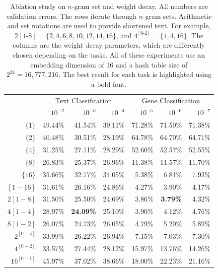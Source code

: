 \documentclass[sigconf,review, anonymous]{acmart}
\begin{document}
\begin{table}[t]
  \caption{Ablation study on \(n\)-gram set and weight decay. All numbers are validation errors. The rows iterate through \(n\)-gram sets. Arithmetic and set notations are used to provide shortened text. For example, \(2[1\text{-}8] = \{2,4,6,8,10,12,14,16\}\), and \(4^{[0\text{-}2]}=\{1,4,16\}\). The columns are the weight decay parameters, which are differently chosen depending on the tasks. All of these experiments use an embedding dimension of 16 and a hash table size of \(2^{24}=16,777,216\). The best result for each task is highlighted using a bold font.}
  \label{tab:gram}
  \begin{center}
    \begin{tabular}{r|rrr|rrr}
      \hline
      & \multicolumn{3}{|c}{Text Classification}  & \multicolumn{3}{|c}{Gene Classification} \\
      & \(10^{-2}\) & \(10^{-3}\) & \(10^{-4}\) & \(10^{-5}\) & \(10^{-6}\) & \(10^{-7}\) \\ \hline
      \(\{1\}\) & 49.44\% & 41.54\% & 39.11\% & 71.28\% & 71.50\% & 71.38\% \\
      \(\{2\}\) & 40.48\% & 30.51\% & 28.19\% & 64.78\% & 64.70\% & 64.71\% \\
      \(\{4\}\) & 31.25\% & 27.11\% & 28.29\% & 52.60\% & 52.57\% & 52.55\% \\
      \(\{8\}\) & 26.83\% & 25.37\% & 26.96\% & 11.38\% & 11.57\% & 11.70\% \\
      \(\{16\}\) & 35.66\% & 32.77\% & 34.05\% & 5.38\% & 6.81\% & 7.93\% \\
      \([1-16]\) & 31.61\% & 26.16\% & 24.86\% & 4.27\% & 3.90\% & 4.17\% \\
      \(2[1-8]\) & 31.50\% & 25.50\% & 24.69\% & 3.86\% & \textbf{3.79\%} & 4.32\% \\
      \(4[1-4]\) & 28.97\% & \textbf{24.09\%} & 25.10\% & 3.90\% & 4.12\% & 4.76\% \\
      \(8[1-2]\) & 26.07\% & 24.73\% & 26.05\% & 4.79\% & 5.20\% & 5.89\% \\
      \(2^{[0-4]}\) & 33.99\% & 26.22\% & 26.94\% & 7.15\% & 7.03\% & 7.30\% \\
      \(4^{[0-2]}\) & 33.57\% & 27.44\% & 28.12\% & 15.97\% & 13.76\% & 14.26\% \\
      \(16^{[0-1]}\) & 45.97\% & 37.02\% & 38.66\% & 18.00\% & 22.23\% & 21.16\%\\
    \hline
    \end{tabular}
  \end{center}
\end{table}
\end{document}
